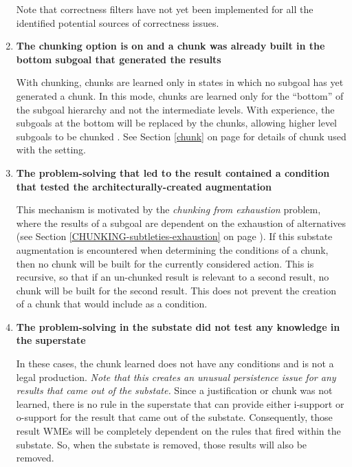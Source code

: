 \begin{enumerate}
	Note that correctness filters have not yet been implemented for all the identified potential sources of correctness issues.

	\item \textbf{The chunking option  is on and a chunk was already built in the bottom subgoal that generated the results}

	With  chunking, chunks are learned only in states in which no subgoal has yet generated a chunk. In this mode, chunks are learned only for the ``bottom'' of the subgoal hierarchy and not the intermediate levels. With experience, the subgoals at the bottom will be replaced by the chunks, allowing higher level subgoals to be chunked .  See Section \ref{chunk} on page \pageref{chunk} for details of chunk used with the  setting.

	\item \textbf{The problem-solving that led to the result contained a condition that tested the architecturally-created  augmentation}

	This mechanism is motivated by the \textit{chunking from exhaustion} problem, where the results of a subgoal are dependent on the exhaustion of alternatives (see Section \ref{CHUNKING-subtleties-exhaustion} on page \pageref{CHUNKING-subtleties-exhaustion}). If this substate augmentation is encountered when determining the conditions of a chunk, then no chunk will be built for the currently considered action. This is recursive, so that if an un-chunked result is relevant to a second result, no chunk will be built for the second result. This does not prevent the creation of a chunk that would include  as a condition.

	\item \textbf{The problem-solving in the substate did not test any knowledge in the superstate}

	In these cases, the chunk learned does not have any conditions and is not a legal production.  \emph{Note that this creates an unusual persistence issue for any results that came out of the substate.}  Since a justification or chunk was not learned, there is no rule in the superstate that can provide either i-support or o-support for the result that came out of the substate.   Consequently, those result WMEs will be completely dependent on the rules that fired within the substate.  So, when the substate is removed, those results will also be removed.
\end{enumerate}



